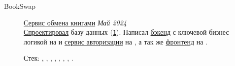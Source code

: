 \documentclass[margin,line]{resume}
\begin{document}
\begin{resume}
\begin{description}
      \item[BookSwap]\small{\href{https://github.com/alchemmist/bookswap}{Сервис
          обмена книгами} \hfill
        \textsl{Май 2024\vspace{1mm}}}\\
        \href{https://github.com/alchemmist/bookswap/blob/dev/docs/database.md}{Спроектировал}
        базу данных
        (\href{https://github.com/alchemmist/bookswap/blob/dev/backend/src/main/resources/schema.sql}{\texttt{1}}).
        Написал
        \href{https://github.com/alchemmist/bookswap/tree/dev/backend}{бэкенд}
        с ключевой бизнес-логикой на  и
        \href{https://github.com/alchemmist/bookswap/tree/dev/auth-service}{сервис
        авторизации} на , а так же
        \href{https://github.com/alchemmist/bookswap/tree/dev/frontend}{фронтенд}
        на
        .

        Стек: ,
        , ,
        , , ,
        , .

    \end{description}
  \end{resume}

  \clearpage

  
\end{document}
